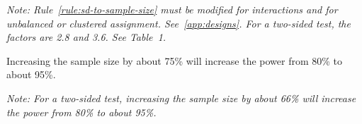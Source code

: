 \documentclass[12pt]{article}
\begin{document}
{\noindent \footnotesize \textit{Note: Rule~\ref{rule:sd-to-sample-size} must be modified for interactions and for unbalanced or clustered assignment. See~\ref{app:designs}. For a two-sided test, the factors are 2.8 and 3.6. See Table~1.}}

\begin{rule0}[80\% to 95\% Power]
\label{rule:80-to-95}
Increasing the sample size by about 75\% will increase the power from 80\% to about 95\%.
\end{rule0}

{\noindent \footnotesize\textit{Note: For a two-sided test, increasing the sample size by about 66\% will increase the power from 80\% to about 95\%.}}

\printbibliography
\end{document}
